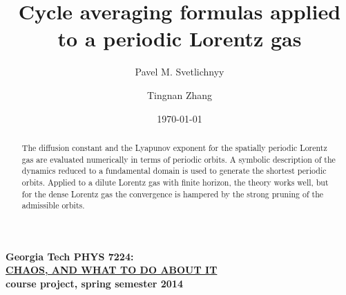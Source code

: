\documentclass[pre,preprint,groupedaddress,showpacs,showkeys]{revtex4}
\begin{document}
				\title{
Cycle averaging formulas applied to a periodic Lorentz gas
				}\author{
Pavel M. Svetlichnyy}
                \author{
Tingnan Zhang}
				\date{\today} %

				\begin{abstract}
The diffusion constant and the Lyapunov exponent
for the spatially periodic Lorentz gas are evaluated
numerically in terms of periodic orbits.
A symbolic description of the dynamics reduced to a fundamental domain is
used to generate the shortest periodic orbits.
Applied to a dilute Lorentz gas with finite horizon, the
theory works well, but for the dense Lorentz gas the convergence
is hampered by the strong pruning of the admissible orbits.
                \end{abstract}
					\maketitle

\noindent
{\bf Georgia Tech PHYS 7224:}\\
\underline{\bf CHAOS, AND WHAT TO DO ABOUT IT }\\
{\bf course project, spring semester 2014}


\ifboyscout
{}
\fi
\end{document}
